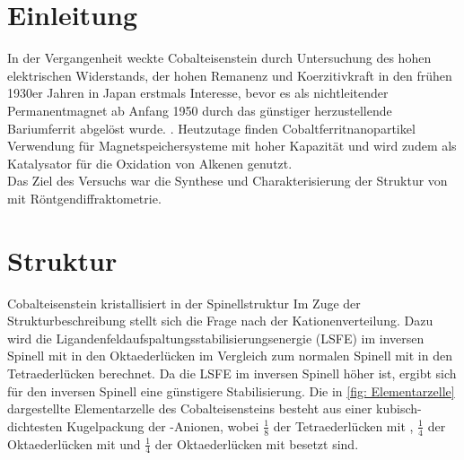 \documentclass[a4paper,12pt,bibliography=totocnumbered]{scrartcl}
\begin{document}
\clearpage

\renewcommand{\thepage}{\arabic{page}}
\setcounter{page}{1}


\section{Einleitung}
In der Vergangenheit weckte Cobalteisenstein durch Untersuchung des hohen elektrischen Widerstands, der hohen Remanenz und Koerzitivkraft in den frühen 1930er Jahren in Japan erstmals Interesse, bevor es als nichtleitender Permanentmagnet ab Anfang 1950 durch das günstiger herzustellende Bariumferrit abgelöst wurde.
\cite{History}.
Heutzutage finden Cobaltferritnanopartikel Verwendung für Magnetspeichersysteme mit hoher Kapazität und  wird zudem als Katalysator für die Oxidation von Alkenen genutzt. \cite{Rieck} \\
Das Ziel des Versuchs war die Synthese und Charakterisierung der Struktur von  mit Röntgendiffraktometrie.

\section{Struktur}
Cobalteisenstein kristallisiert in der Spinellstruktur %
Im Zuge der Strukturbeschreibung stellt sich die Frage nach der Kationenverteilung. 
Dazu wird die Ligandenfeldaufspaltungsstabilisierungsenergie (LSFE) im inversen Spinell mit  in den Oktaederlücken im Vergleich zum normalen Spinell mit  in den Tetraederlücken berechnet. 
Da die LSFE im inversen Spinell höher ist, ergibt sich für den inversen Spinell eine günstigere Stabilisierung.
Die in \autoref{fig: Elementarzelle} dargestellte Elementarzelle des Cobalteisensteins besteht aus einer kubisch-dichtesten Kugelpackung der -Anionen, wobei $\frac{1}{8}$ der Tetraederlücken mit , 
$\frac{1}{4}$ der Oktaederlücken mit  und $\frac{1}{4}$ der Oktaederlücken mit  besetzt sind. \\
\end{document}
